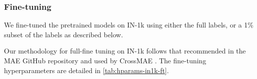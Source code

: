\subsubsection{Fine-tuning}
\label{s:in1k-ft}

We fine-tuned the pretrained models on IN-1k using either the full labels, or a 1\% subset of the labels as described below.

Our methodology for full-fine tuning on IN-1k follows that recommended in the MAE GitHub repository and used by CrossMAE \citep{fu2025crossmae}.
The fine-tuning hyperparameters are detailed in \cref{tab:hparams-in1k-ft}.

\begin{table}[tbh]
\centering
\caption{%
Hyperparameter configuration for IN-1k classification fine-tuning.
Learning rate (LR) reference values are shown relative to a batch size of 256 and linearly scaled for the actual batch size.
For 1\% fine-tuning, we sweep five LR values and report the best; the swept ranges are shown.
}
\label{tab:hparams-in1k-ft}
\small
{}
\end{table}
